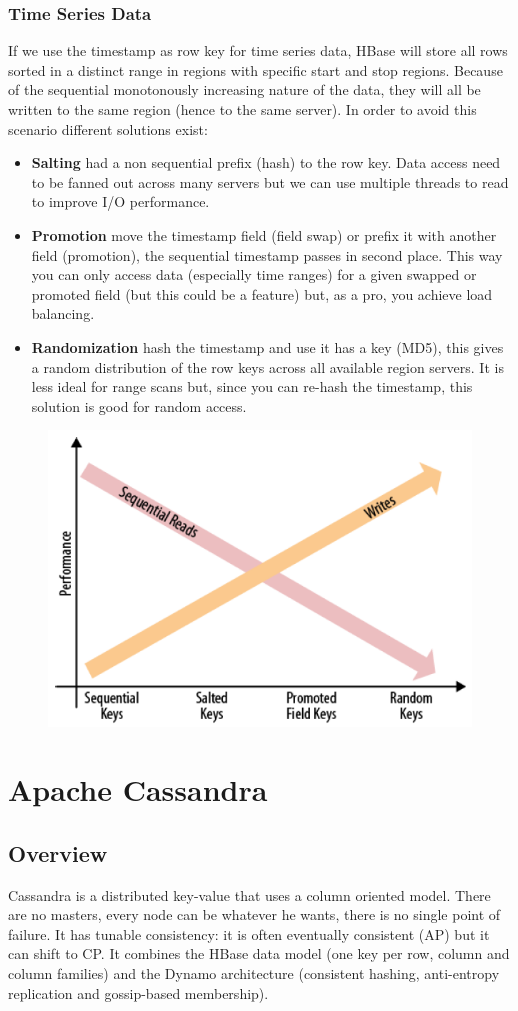 		\subsubsection{Time Series Data}
			If we use the timestamp as row key for time series data, HBase will store all rows sorted in a distinct range in regions with specific start and stop regions. Because of the sequential monotonously increasing nature of the data, they will all be written to the same region (hence to the same server).\newline
			In order to avoid this scenario different solutions exist:
			\begin{itemize}
				\item \textbf{Salting} had a non sequential prefix (hash) to the row key. Data access need to be fanned out across many servers but we can use multiple threads to read to improve I/O performance.
				\item \textbf{Promotion} move the timestamp field (field swap) or prefix it with another field (promotion), the sequential timestamp passes in second place. This way you can only access data (especially time ranges) for a given swapped or promoted field (but this could be a feature) but, as a pro, you achieve load balancing.
				\item \textbf{Randomization} hash the timestamp and use it has a key (MD5), this gives a random distribution of the row keys across all available region servers. It is less ideal for range scans but, since you can re-hash the timestamp, this solution is good for random access.
			\end{itemize}
			\begin{figure}[H]
				\centering
				\includegraphics[width=0.46\linewidth]{images/timeseries.png}
			\end{figure}
	
\section{Apache Cassandra}
	\subsection{Overview}
	Cassandra is a distributed key-value that uses a column oriented model. There are no masters, every node can be whatever he wants, there is no single point of failure.\newline
	It has tunable consistency: it is often eventually consistent (AP) but it can shift to CP.\newline
	\newline
	It combines the HBase data model (one key per row, column and column families) and the Dynamo architecture (consistent hashing, anti-entropy replication and gossip-based membership).
